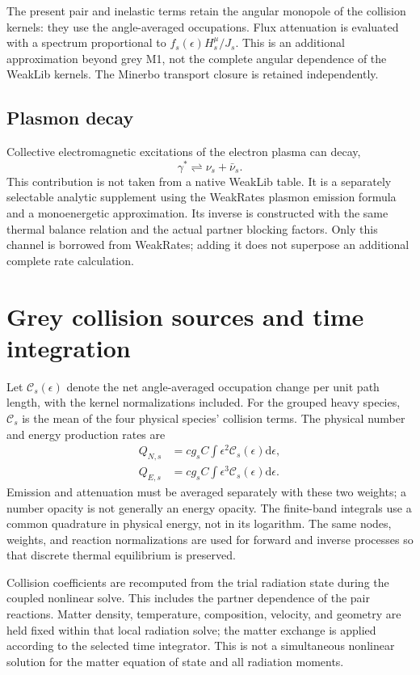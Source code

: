 \documentclass[aps,prd,reprint,nofootinbib,notitlepage]{revtex4-2}
\newcommand{\dd}{\mathrm{d}}
\begin{document}
The present pair and inelastic terms retain the angular monopole of the
collision kernels: they use the angle-averaged occupations. Flux attenuation
is evaluated with a spectrum proportional to $f_s(\epsilon)H_s^\mu/J_s$.
This is an additional approximation beyond grey M1, not the complete
angular dependence of the WeakLib kernels. The Minerbo transport closure
is retained independently.

\subsection{Plasmon decay}

Collective electromagnetic excitations of the electron plasma can decay,
\begin{equation}
 \gamma^*\rightleftharpoons\nu_s+\bar\nu_s.
\end{equation}
This contribution is not taken from a native WeakLib table. It is a
separately selectable analytic supplement using the WeakRates plasmon
emission formula and a monoenergetic approximation. Its inverse is
constructed with the same thermal balance relation and the actual partner
blocking factors. Only this channel is borrowed from WeakRates; adding it
does not superpose an additional complete rate calculation.

\section{Grey collision sources and time integration}

Let $\mathcal C_s(\epsilon)$ denote the net angle-averaged occupation
change per unit path length, with the kernel normalizations included.
For the grouped heavy species, $\mathcal C_s$ is the mean of the four
physical species' collision terms. The physical number and energy
production rates are
\begin{align}
 Q_{N,s}&=cg_s C\int\epsilon^2\mathcal C_s(\epsilon)\dd\epsilon,\\
 Q_{E,s}&=cg_s C\int\epsilon^3\mathcal C_s(\epsilon)\dd\epsilon.
\end{align}
Emission and attenuation must be averaged separately with these two
weights; a number opacity is not generally an energy opacity.
The finite-band integrals use a common quadrature in physical energy,
not in its logarithm. The same nodes, weights, and reaction normalizations
are used for forward and inverse processes so that discrete thermal
equilibrium is preserved.

Collision coefficients are recomputed from the trial radiation state
during the coupled nonlinear solve. This includes the partner dependence
of the pair reactions. Matter density, temperature, composition, velocity,
and geometry are held fixed within that local radiation solve; the
matter exchange is applied according to the selected time integrator.
This is not a simultaneous nonlinear solution for the matter equation of
state and all radiation moments.
\end{document}
